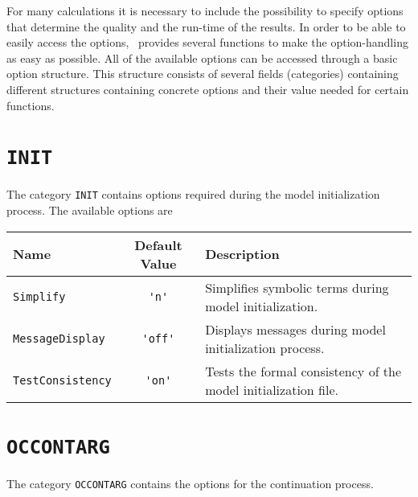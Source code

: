 For many calculations it is necessary to include the possibility to specify options that determine the quality and the run-time of the results. In order to be able to easily access the options, \OCMAT\ provides several functions to make the option-handling as easy as possible. All of the available options can be accessed through a basic option structure. This structure consists of several fields (categories) containing different structures containing concrete options and their value needed for certain functions.
\section{\texorpdfstring{\lstinline+INIT+}{INIT}}
\label{sec:options_opts_init}
The category \lstinline+INIT+ contains options required during the model initialization process. The available options are

\begin{tabularx}{\linewidth}{|l|c|X|}\hline
\textbf{Name} & \textbf{Default Value} & \textbf{Description}\\\hline
\lstinline+Simplify+  &  \lstinline+'n'+   & Simplifies symbolic terms during model initialization.\\
\lstinline+MessageDisplay+  &  \lstinline+'off'+   & Displays messages during model initialization process.\\
\lstinline+TestConsistency+  &  \lstinline+'on'+   & Tests the formal consistency of the model initialization file.\\
\hline
\end{tabularx}

\section{\texorpdfstring{\lstinline+OCCONTARG+}{OCCONTARG}}
\label{sec:options_opts_occontarg}

The category \lstinline+OCCONTARG+ contains the options for the continuation process.

